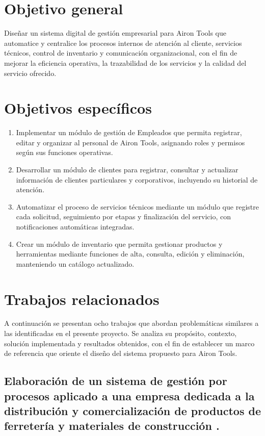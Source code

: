 \section{Objetivo general}
Diseñar un sistema digital de gestión empresarial para Airon Tools que automatice y centralice los procesos internos de atención al cliente, servicios técnicos, control de inventario y comunicación organizacional, con el fin de mejorar la eficiencia operativa, la trazabilidad de los servicios y la calidad del servicio ofrecido.

\section{Objetivos específicos}
\begin{enumerate}
    \item Implementar un módulo de gestión de Empleados que permita registrar, editar y organizar al personal de Airon Tools, asignando roles y permisos según sus funciones operativas.

    \item Desarrollar un módulo de clientes para registrar, consultar y actualizar información de clientes particulares y corporativos, incluyendo su historial de atención.

    \item Automatizar el proceso de servicios técnicos mediante un módulo que registre cada solicitud, seguimiento por etapas y finalización del servicio, con notificaciones automáticas integradas.

    \item Crear un módulo de inventario que permita gestionar productos y herramientas mediante funciones de alta, consulta, edición y eliminación, manteniendo un catálogo actualizado.
\end{enumerate}


\section{Trabajos relacionados}

A continuación se presentan ocho trabajos que abordan problemáticas similares a las identificadas en el presente proyecto. Se analiza su propósito, contexto, solución implementada y resultados obtenidos, con el fin de establecer un marco de referencia que oriente el diseño del sistema propuesto para Airon Tools.

\subsection{Elaboración de un sistema de gestión por procesos aplicado a una empresa dedicada a la distribución y comercialización de productos de ferretería y materiales de construcción \cite{Vargas2018}.}

